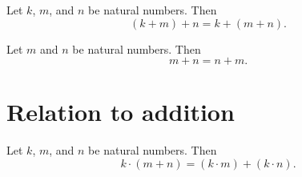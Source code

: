\begin{proposition}[Associative]
Let $k$, $m$, and $n$ be natural numbers.
Then
  \[
(k + m) + n = k + (m + n).
  \]\end{proposition}
\begin{proposition}[Commutative]
Let $m$ and $n$ be natural numbers.
Then
  \[
m + n = n + m.
  \]\end{proposition}
\section*{Relation to addition}

\begin{proposition}[Distributive]
Let $k$, $m$, and $n$ be natural numbers.
Then
  \[
k \cdot  (m + n) = (k \cdot  m) + (k \cdot  n).
  \]\end{proposition}